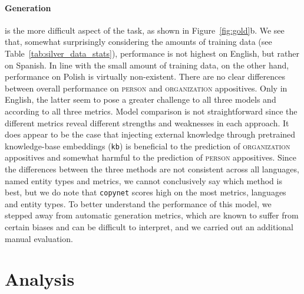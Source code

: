 \documentclass[11pt]{article}
\newcommand{\jttodo}[1]{\todo[color=blue!20]{#1}}
\begin{document}
\paragraph{Generation} is the more difficult aspect of the task, as shown in Figure~\ref{fig:gold}b. We see that, somewhat surprisingly considering the amounts of training data (see Table~\ref{tab:silver_data_stats}),  performance is not highest on English, but rather on Spanish. In line with the small amount of training data, on the other hand, performance on Polish is virtually non-existent. There are no clear differences between overall performance on \textsc{person} and \textsc{organization} appositives. Only in English, the latter seem to pose a greater challenge to all three models and according to all three metrics. Model comparison is not straightforward since the different metrics reveal different strengths and weaknesses in each approach. It does appear to be the case that injecting external knowledge through pretrained knowledge-base embeddings (\texttt{kb}) is beneficial to the prediction of \textsc{organization} appositives and somewhat harmful to the prediction of \textsc{person} appositives. Since the differences between the three methods are not consistent across all languages, named entity types and metrics, we cannot conclusively say which method is best, but we do note that \texttt{copynet} scores high on the most metrics, languages and entity types. To better understand the performance of this model, we stepped away from automatic generation metrics, which are known to suffer from certain biases and can be difficult to interpret, and we carried out an additional manual evaluation.%

\section{Analysis}
\label{sec:analysis}
\end{document}

